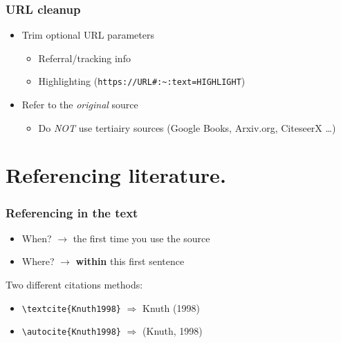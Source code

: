 \documentclass[aspectratio=169]{beamer}
\begin{document}
\begin{frame}[fragile]
	\frametitle{URL cleanup}
	
	\begin{itemize}
		\item Trim optional URL parameters  
		\begin{itemize}
			\item Referral/tracking info
			\item Highlighting (\verb+https://URL#:~:text=HIGHLIGHT+)
		\end{itemize}
		\item Refer to the \textit{original} source
		\begin{itemize}
			\item Do \emph{NOT} use tertiairy sources (Google Books, Arxiv.org, CiteseerX \ldots)
		\end{itemize}
	\end{itemize}
	
\end{frame}

\section{Referencing literature.}

\begin{frame}[fragile]
  \frametitle{Referencing in the text}
  
  \begin{itemize}
  	\item When? $\rightarrow$ the first time you use the source
  	\item Where? $\rightarrow$ \textcolor{hgorange}{\textbf{within}} this first sentence
  \end{itemize}
  \bigskip
  Two different citations methods:

  \begin{itemize}
    \item \verb|\textcite{Knuth1998}| \(\Rightarrow\) Knuth (1998)
    \item \verb|\autocite{Knuth1998}| \(\Rightarrow\) (Knuth, 1998)
  \end{itemize}
\end{frame}
\end{document}
